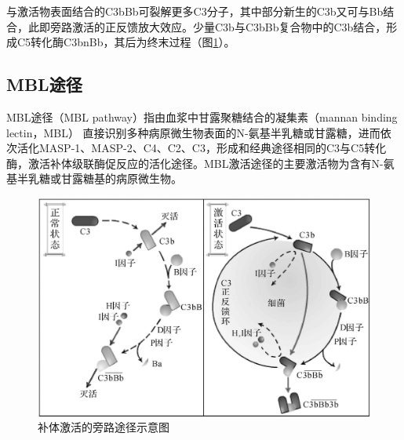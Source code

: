 与激活物表面结合的C3bBb可裂解更多C3分子，其中部分新生的C3b又可与Bb结合，此即旁路激活的正反馈放大效应。少量C3b与C3bBb复合物中的C3b结合，形成C5转化酶C3bnBb，其后为终末过程（图\ref{fig5-5}）。

\subsection{MBL途径}

MBL途径（MBL pathway）指由血浆中甘露聚糖结合的凝集素（mannan binding
lectin，MBL）
直接识别多种病原微生物表面的N-氨基半乳糖或甘露糖，进而依次活化MASP-1、MASP-2、C4、C2、C3，形成和经典途径相同的C3与C5转化酶，激活补体级联酶促反应的活化途径。MBL激活途径的主要激活物为含有N-氨基半乳糖或甘露糖基的病原微生物。
\begin{figure}[!htbp]
    \centering
    \begin{minipage}[b]{0.45\textwidth} 
        \centering
        \includegraphics[height=.2\textheight]{./images/Image00083.jpg}
        \captionsetup{justification=centering}
        \caption{补体激活的旁路途径示意图}
        \label{fig5-5}
    \end{minipage}
\hspace{0.04\textwidth}%
\begin{minipage}[b]{0.45\textwidth} 
    \centering

\end{minipage}
\end{figure}
